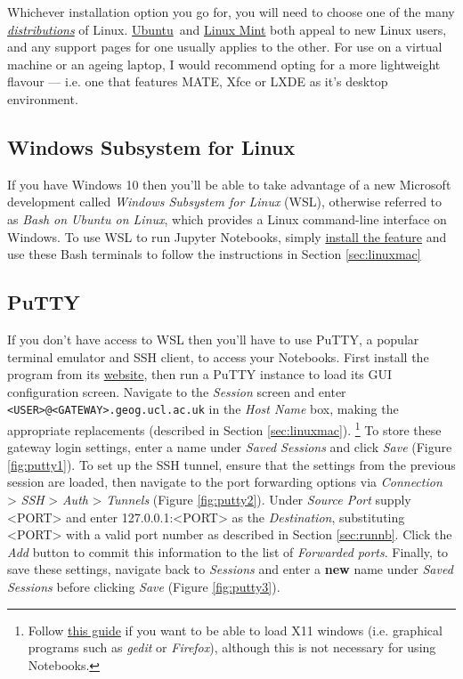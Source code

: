 \documentclass[a4paper]{article}
\begin{document}
Whichever installation option you go for, you will need to choose one of the many \emph{\href{http://distrowatch.com/dwres.php?resource=major}{distributions}} of Linux. \href{https://www.ubuntu.com/download}{Ubuntu}~and \href{https://linuxmint.com/}{Linux Mint} both appeal to new Linux users, and any support pages for one usually applies to the other.
For use on a virtual machine or an ageing laptop, I would recommend opting for a more lightweight flavour --- i.e. one that features MATE, Xfce or LXDE as it's desktop environment.

\subsection{Windows Subsystem for Linux}
\label{sec:wsl}
If you have Windows 10 then you'll be able to take advantage of a new Microsoft development called \emph{Windows Subsystem for Linux} (WSL), otherwise referred to as \emph{Bash on Ubuntu on Linux}, which provides a Linux command-line interface on Windows.
To use WSL to run Jupyter Notebooks, simply \href{https://msdn.microsoft.com/en-gb/commandline/wsl/install_guide}{install the feature} and use these Bash terminals to follow the instructions in Section \ref{sec:linuxmac}

\subsection{PuTTY}
\label{sec:putty}

If you don't have access to WSL then you'll have to use PuTTY, a popular terminal emulator and SSH client, to access your Notebooks. 
First install the program from its \href{http://www.chiark.greenend.org.uk/~sgtatham/putty/latest.html}{website}, then run a PuTTY instance to load its GUI configuration screen. 
Navigate to the \emph{Session} screen and enter \texttt{\textless{}USER\textgreater{}@\textless{}GATEWAY\textgreater{}.geog.ucl.ac.uk} in the \emph{Host Name} box, making the appropriate replacements (described in Section \ref{sec:linuxmac}).
\footnote{Follow \href{http://www.geo.mtu.edu/geoschem/docs/putty_install.html}{this guide} if you want to be able to load X11 windows (i.e. graphical programs such as \emph{gedit} or \emph{Firefox}), although this is not necessary for using Notebooks.}
To store these gateway login settings, enter a name under \emph{Saved Sessions} and click \emph{Save} (Figure \ref{fig:putty1}).
To set up the SSH tunnel, ensure that the settings from the previous session are loaded, then navigate to the port forwarding options via \emph{Connection} \textgreater{} \emph{SSH} \textgreater{} \emph{Auth} \textgreater{} \emph{Tunnels} (Figure \ref{fig:putty2}). 
Under \emph{Source Port} supply \textless{}PORT\textgreater{} and enter 127.0.0.1:\textless{}PORT\textgreater{} as the \emph{Destination}, substituting \textless{}PORT\textgreater{} with a valid port number as described in Section \ref{sec:runnb}.
Click the \emph{Add} button to commit this information to the list of \emph{Forwarded ports}.
Finally, to save these settings, navigate back to \emph{Sessions} and enter a \textbf{new} name under \emph{Saved Sessions} before clicking \emph{Save} (Figure \ref{fig:putty3}).
\end{document}
